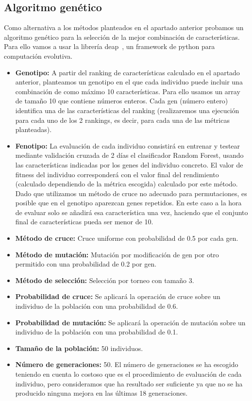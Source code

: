 \documentclass[a4paper,12pt,twoside,oldfontcommands]{memoir}
\begin{document}
	\subsection{Algoritmo genético}
	Como alternativa a los métodos planteados en el apartado anterior probamos un algoritmo genético para la selección de la mejor combinación de características. Para ello vamos a usar la librería  deap~\cite{DEAP_JMLR2012}, un framework de python para computación evolutiva. 
	
	
	\begin{itemize}
		\item \textbf{Genotipo:} A partir del ranking de características calculado en el apartado anterior, planteamos un genotipo en el que cada individuo puede incluir una combinación de como máximo 10 características. Para ello usamos un array de tamaño 10 que contiene números enteros. Cada gen (número entero) identifica una de las características del ranking (realizaremos una ejecución para cada uno de los 2 rankings, es decir, para cada una de las métricas planteadas). 
		\item \textbf{Fenotipo:} La evaluación de cada individuo consistirá en entrenar y testear mediante validación cruzada de 2 días el clasificador Random Forest, usando las características indicadas por los genes del individuo concreto. El valor de fitness del individuo corresponderá con el valor final del rendimiento (calculado dependiendo de la métrica escogida) calculado por este método. Dado que utilizamos un método de cruce no adecuado para permutaciones, es posible que en el genotipo aparezcan genes repetidos. En este caso a la hora de evaluar solo se añadirá esa característica una vez, haciendo que el conjunto final de características pueda ser menor de 10. 
		\item \textbf{Método de cruce:} Cruce uniforme con probabilidad de 0.5 por cada gen. 
		\item \textbf{Método de mutación:} Mutación por modificación de gen por otro permitido con una probabilidad de 0.2 por gen.
		\item \textbf{Método de selección: } Selección por torneo con tamaño 3. 
		\item \textbf{Probabilidad de cruce:} Se aplicará la operación de cruce sobre un individuo de la población con una probabilidad de 0.6. 
		\item \textbf{Probabilidad de mutación:} Se aplicará la operación de mutación sobre un individuo de la población con una probabilidad de 0.1. 
		\item \textbf{Tamaño de la población: } 50 individuos. 
		\item \textbf{Número de generaciones: } 50. El número de generaciones se ha escogido teniendo en cuenta lo costoso que es el procedimiento de evaluación de cada individuo, pero consideramos que ha resultado ser suficiente ya que no se ha producido ninguna mejora en las últimas 18 generaciones. 
	\end{itemize}
	
\end{document}
